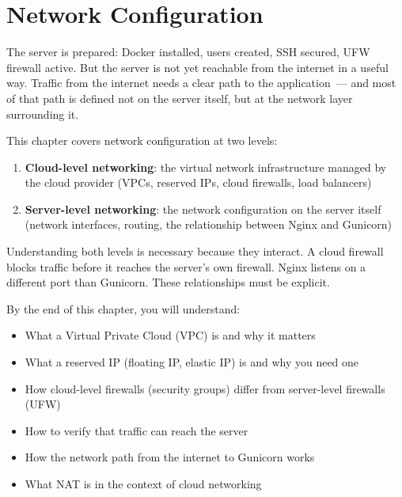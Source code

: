\setcounter{chapter}{21}
\chapter{Network Configuration}\label{ch:22-network-configuration}

\chapterrule

The server is prepared: Docker installed, users created, SSH secured, UFW firewall active. But the server is not yet reachable from the internet in a useful way. Traffic from the internet needs a clear path to the application~--- and most of that path is defined not on the server itself, but at the network layer surrounding it.

This chapter covers network configuration at two levels:

\begin{enumerate}
\def\labelenumi{\arabic{enumi}.}
\tightlist
\item
  \textbf{Cloud-level networking}: the virtual network infrastructure managed by the cloud provider (VPCs, reserved IPs, cloud firewalls, load balancers)
\item
  \textbf{Server-level networking}: the network configuration on the server itself (network interfaces, routing, the relationship between Nginx and Gunicorn)
\end{enumerate}

\noindent{}Understanding both levels is necessary because they interact. A cloud firewall blocks traffic before it reaches the server's own firewall. Nginx listens on a different port than Gunicorn. These relationships must be explicit.

\begin{objectives}

By the end of this chapter, you will understand:

\begin{itemize}
\tightlist
\item
  What a Virtual Private Cloud (VPC) is and why it matters
\item
  What a reserved IP (floating IP, elastic IP) is and why you need one
\item
  How cloud-level firewalls (security groups) differ from server-level firewalls (UFW)
\item
  How to verify that traffic can reach the server
\item
  How the network path from the internet to Gunicorn works
\item
  What NAT is in the context of cloud networking
\end{itemize}

\end{objectives}

